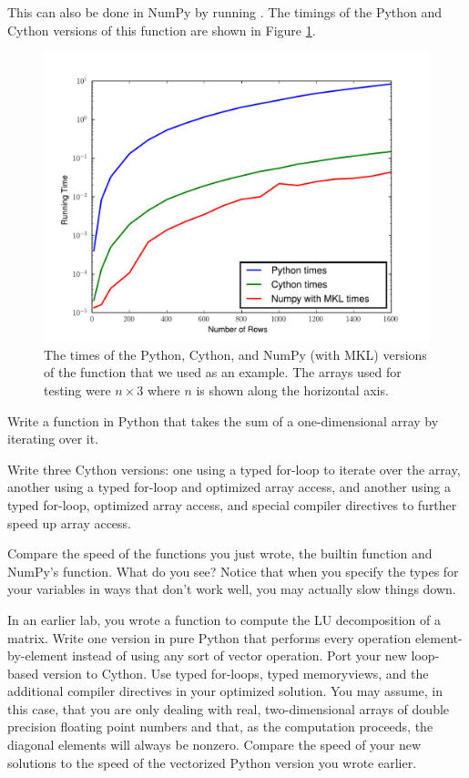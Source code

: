 This can also be done in NumPy by running .
The timings of the Python and Cython versions of this function are shown in Figure \ref{cython:rowdot}.

\begin{figure}
\centering
\includegraphics[width=\textwidth]{rowdot.pdf}
\caption{The times of the Python, Cython, and NumPy (with MKL) versions of the  function that we used as an example.
The arrays used for testing were $n\times 3$ where $n$ is shown along the horizontal axis.}
\label{cython:rowdot}
\end{figure}

\begin{problem}
Write a function in Python that takes the sum of a one-dimensional array by iterating over it.

Write three Cython versions: one using a typed for-loop to iterate over the array, another using a typed for-loop and optimized array access, and another using a typed for-loop, optimized array access, and special compiler directives to further speed up array access.

Compare the speed of the functions you just wrote, the builtin  function and NumPy's  function.
What do you see?
Notice that when you specify the types for your variables in ways that don't work well, you may actually slow things down.
\end{problem}

\begin{problem}
In an earlier lab, you wrote a function to compute the LU decomposition of a matrix.
Write one version in pure Python that performs every operation element-by-element instead of using any sort of vector operation.
Port your new loop-based version to Cython.
Use typed for-loops, typed memoryviews, and the additional compiler directives in your optimized solution.
You may assume, in this case, that you are only dealing with real, two-dimensional arrays of double precision floating point numbers and that, as the computation proceeds, the diagonal elements will always be nonzero.
Compare the speed of your new solutions to the speed of the vectorized Python version you wrote earlier.
\end{problem}

